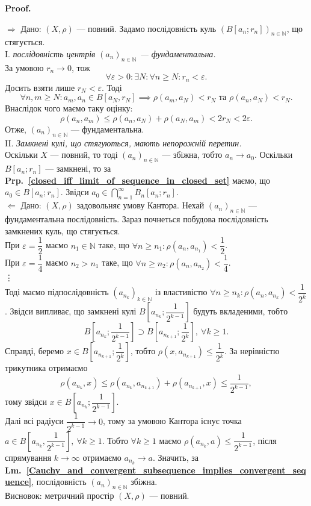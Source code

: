 \documentclass[a4paper, 10pt]{article}
\makeatletter
\def\rightproof{$\boxed{\Rightarrow}$ }
\def\leftproof{$\boxed{\Leftarrow}$ }
\theoremstyle{theoremdd}
\theoremstyle{theoremdd}
\theoremstyle{theoremdd}
\theoremstyle{theoremdd}
\theoremstyle{theoremdd}
\theoremstyle{theoremdd}
\theoremstyle{theoremdd}
\theoremstyle{theoremdd}
\newcommand\prpref[1]{\textbf{Prp.~\ref{#1}}}
\newcommand\lmref[1]{\textbf{Lm.~\ref{#1}}}
\renewenvironment{proof}[1][Proof.\\]{\par
\pushQED{\hfill \qed}%
\normalfont \topsep6\p@\@plus6\p@\relax
\trivlist
\item\relax
{\bfseries
#1\@addpunct{.}}\hspace\labelsep\ignorespaces
}{%
\popQED\endtrivlist\@endpefalse
}
\makeatother
\begin{document}
\begin{proof}
\rightproof Дано: $(X,\rho)$ --- повний. Задамо послідовність куль $(B[a_n;r_n])_{n \in \mathbb{N}}$, що стягується.\\
I. \textit{послідовність центрів $(a_n)_{n \in \mathbb{N}}$ --- фундаментальна.}\\
За умовою $r_n \to 0$, тож
\[
\forall \varepsilon > 0: \exists N: \forall n \geq N: r_n < \varepsilon.
\]
Досить взяти лише $r_N < \varepsilon$. Тоді 
\[
\forall n,m \geq N: a_m,a_n \in B[a_N,r_N] \implies \rho(a_m,a_N) < r_N \text{ та } \rho(a_n,a_N) < r_N.
\]
Внаслідок чого маємо таку оцінку:
\[
\rho(a_n,a_m) \leq \rho(a_n,a_N) + \rho(a_N,a_m) < 2r_N < 2 \varepsilon.
\]
Отже, $(a_n)_{n \in \mathbb{N}}$ --- фундаментальна.
\bigskip \\
II. \textit{Замкнені кулі, що стягуються, мають непорожній перетин.}\\
Оскільки $X$ --- повний, то тоді $(a_n)_{n \in \mathbb{N}}$ --- збіжна, тобто $a_n \to a_0$. Оскільки $B[a_n;r_n]$ --- замкнені, то за \prpref{closed_iff_limit_of_sequence_in_closed_set} маємо, що $a_0 \in B[a_n;r_n]$. Звідси $a_0 \displaystyle \in \bigcap_{n=1}^\infty B_n[a_n;r_n]$.
\bigskip \\
\leftproof Дано: $(X,\rho)$ задовольняє умову Кантора. Нехай $(a_n)_{n \in \mathbb{N}}$ --- фундаментальна послідовність. Зараз почнеться побудова послідовність замкнених куль, що стягується.\\
При $\varepsilon = \dfrac{1}{2}$ маємо $n_1 \in \mathbb{N}$ таке, що $\forall n \geq n_1: \rho(a_n,a_{n_1}) < \dfrac{1}{2}$.\\
При $\varepsilon = \dfrac{1}{4}$ маємо $n_2 > n_1$ таке, що $\forall n \geq n_2: \rho(a_n,a_{n_2}) < \dfrac{1}{4}$.\\
\vdots \\
Тоді маємо підпослідовність $(a_{n_k})_{k \in \mathbb{N}}$ із властивістю $\forall n \geq n_k: \rho(a_n,a_{n_k}) < \dfrac{1}{2^k}$. Звідси випливає, що замкнені кулі $B\left[a_{n_k}; \dfrac{1}{2^{k-1}} \right]$ будуть вкладеними, тобто 
\[
B\left[ a_{n_k}; \dfrac{1}{2^{k-1}} \right] \supset B\left[ a_{n_{k+1}}; \dfrac{1}{2^k}\right],\ \forall k \geq 1.
\]
Справді, беремо $x \in B\left[a_{n_{k+1}}; \dfrac{1}{2^{k}} \right]$, тобто $\rho\left(x,a_{n_{k+1}}\right) \leq \dfrac{1}{2^k}$. За нерівністю трикутника отримаємо 
\[
\rho\left(a_{n_k}, x\right) \leq \rho\left(a_{n_k}, a_{n_{k+1}}\right) + \rho\left(a_{n_{k+1}},x\right) \leq \dfrac{1}{2^{k-1}},
\]
тому звідси $x \in B\left[a_{n_k}; \dfrac{1}{2^{k-1}} \right]$.\\
Далі всі радіуси $\dfrac{1}{2^{k-1}} \to 0$, тому за умовою Кантора існує точка $a \in B\left[a_{n_k}, \dfrac{1}{2^{k-1}}\right],\ \forall k \geq 1$. Тобто $\forall k \geq 1$ маємо $\rho\left(a_{n_k},a\right) \leq \dfrac{1}{2^{k-1}}$, після спрямування $k \to \infty$ отримаємо $a_{n_k} \to a$. Значить, за \lmref{Cauchy_and_convergent_subsequence_implies_convergent_sequence}, послідовність $(a_n)_{n \in \mathbb{N}}$ збіжна.\\
Висновок: метричний простір $(X,\rho)$ --- повний.
\end{proof}
\end{document}
